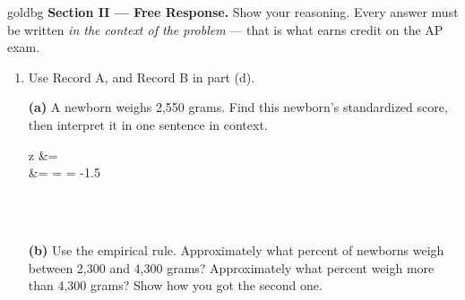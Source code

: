 \vspace{0.14in}

\boxguard[28]
\begin{headlinebox}{goldbg}
\small
\textbf{Section II --- Free Response.} Show your reasoning. Every answer must be written
\emph{in the context of the problem} --- that is what earns credit on the AP exam.
\end{headlinebox}

\vspace{0.10in}

\begin{enumerate}[leftmargin=1.9em, itemsep=0.16in, resume]

  \item Use Record A, and Record B in part (d).

        \boxguard[17]
        \vspace{6pt}
        \textbf{(a)} A newborn weighs 2,550 grams. Find this newborn's standardized score, then
        interpret it in one sentence in context.
        \begin{work}
        z &=  \\[3pt]
          &=  =  = -1.5
        \end{work}
        \\[1pt]
        \\

        \boxguard[17]
        \vspace{6pt}
        \textbf{(b)} Use the empirical rule. Approximately what percent of newborns weigh between
        2,300 and 4,300 grams? Approximately what percent weigh more than 4,300 grams? Show how
        you got the second one.\\[4pt]
        \\[1pt]
        \\[1pt]
        \\


\end{enumerate}
